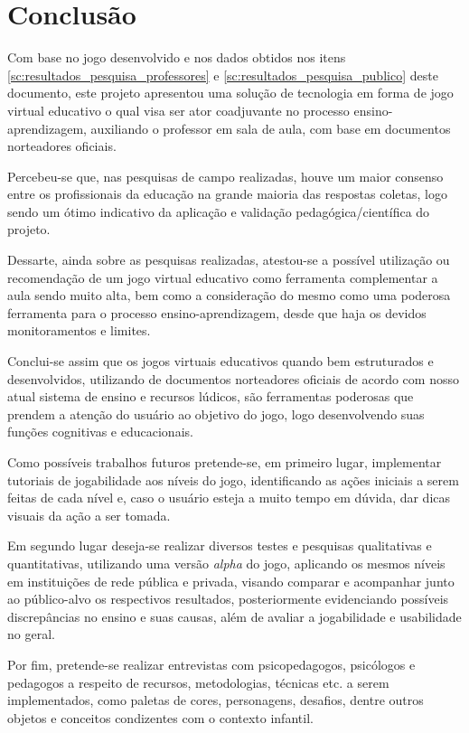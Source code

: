 \documentclass[article,12pt,openany,oneside,a4paper,english,brazil]{abntex2}
\begin{document}
\section{Conclusão}
\label{sc:conclusao}

Com base no jogo desenvolvido e nos dados obtidos nos itens \ref{sc:resultados_pesquisa_professores} e \ref{sc:resultados_pesquisa_publico} deste documento, este projeto apresentou uma solução de tecnologia em forma de jogo virtual educativo o qual visa ser ator coadjuvante no processo ensino-aprendizagem, auxiliando o professor em sala de aula, com base em documentos norteadores oficiais.

Percebeu-se que, nas pesquisas de campo realizadas, houve um maior consenso entre os profissionais da educação na grande maioria das respostas coletas, logo sendo um ótimo indicativo da aplicação e validação pedagógica/científica do projeto.

Dessarte, ainda sobre as pesquisas realizadas, atestou-se a possível utilização ou recomendação de um jogo virtual educativo como ferramenta complementar a aula sendo muito alta, bem como a consideração do mesmo como uma poderosa ferramenta para o processo ensino-aprendizagem, desde que haja os devidos monitoramentos e limites.

Conclui-se assim que os jogos virtuais educativos quando bem estruturados e desenvolvidos, utilizando de documentos norteadores oficiais de acordo com nosso atual sistema de ensino e recursos lúdicos, são ferramentas poderosas que prendem a atenção do usuário ao objetivo do jogo, logo desenvolvendo suas funções cognitivas e educacionais.

Como possíveis trabalhos futuros pretende-se, em primeiro lugar, implementar tutoriais de jogabilidade aos níveis do jogo, identificando as ações iniciais a serem feitas de cada nível e, caso o usuário esteja a muito tempo em dúvida, dar dicas visuais da ação a ser tomada.

Em segundo lugar deseja-se realizar diversos testes e pesquisas qualitativas e quantitativas, utilizando uma versão \textit{alpha} do jogo, aplicando os mesmos níveis em instituições de rede pública e privada, visando comparar e acompanhar junto ao público-alvo os respectivos resultados, posteriormente evidenciando possíveis discrepâncias no ensino e suas causas, além de avaliar a jogabilidade e usabilidade no geral.

Por fim, pretende-se realizar entrevistas com psicopedagogos, psicólogos e pedagogos a respeito de recursos, metodologias, técnicas etc. a serem implementados, como paletas de cores, personagens, desafios, dentre outros objetos e conceitos condizentes com o contexto infantil.
\end{document}

